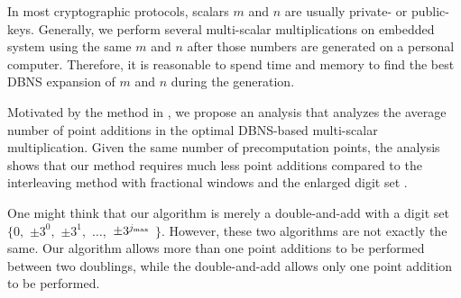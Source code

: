 In most cryptographic protocols, scalars $m$ and $n$ are usually private- or public-keys.
Generally, we perform several multi-scalar multiplications on embedded system using the same $m$ and $n$ after those numbers are generated on a personal computer.
Therefore, it is reasonable to spend time and memory to find the best DBNS expansion of $m$ and $n$ during the generation.

Motivated by the method in \cite{analysisMethod},
we propose an analysis that analyzes the average number of point additions in the optimal DBNS-based multi-scalar multiplication.
Given the same number of precomputation points, the analysis shows that our method requires much less point additions compared to
the interleaving method with fractional windows \cite{fractional} and the enlarged digit set \cite{analysisMethod}.

One might think that our algorithm is merely a double-and-add with a digit set $\{0,$ $\pm 3^0,$ $\pm 3^1,$ $\dots,$ $\pm 3^{j_{\rm max}}$ $\}$.
However, these two algorithms are not exactly the same.
Our algorithm allows more than one point additions to be performed between two doublings,
while the double-and-add allows only one point addition to be performed.
